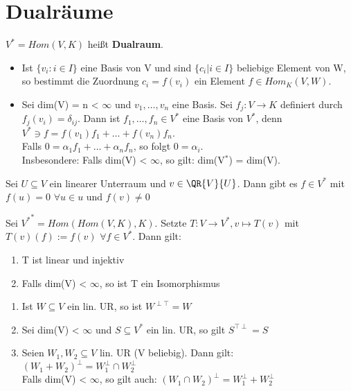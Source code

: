 \chapter{Dualräume}
\begin{definition}
$V^* = Hom(V, K)$ heißt \textbf{Dualraum}.
\end{definition}
\begin{theorem}
\leavevmode
\begin{itemize}
\item Ist $\{ v_i : i \in I \}$ eine Basis von V und sind $\{ c_i | i \in I \}$ beliebige Element von W, so bestimmt die Zuordnung $c_i = f(v_i)$ ein Element $f \in Hom_K(V,W)$.
\item Sei dim(V) = n < $\infty$ und $v_1, …, v_n$ eine Basis. Sei $f_j: V \to K$ definiert durch $f_j(v_i) = \delta_{ij}$. Dann ist $f_1, …, f_n \in V^*$ eine Basis von $V^*$, denn $V^* \ni f = f(v_1)f_1 + … + f(v_n)f_n$.\\
Falls $0 = \alpha_1 f_1 + … + \alpha_n f_n$, so folgt $0 = \alpha_i$.\\
Insbesondere: Falls dim(V) < $\infty$, so gilt: dim(V$^*$) = dim(V).
\end{itemize}
\end{theorem}

\begin{lemma}
Sei $U \subseteq V$ ein linearer Unterraum und $v \in \QR{V}{U}$. 
Dann gibt es $f \in V^*$ mit $f(u) = 0$ $\forall u \in u$ und $f(v) \neq 0$
\end{lemma}

\begin{proposition}
Sei ${V^*}^* = Hom(Hom(V,K), K)$. Setzte $T: V \to V^*, v \mapsto T(v)$ mit $T(v)(f) := f(v)$ $\forall f \in V^*$. Dann gilt:
\begin{enumerate}
\item T ist linear und injektiv
\item Falls dim(V) < $\infty$, so ist T ein Isomorphismus
\end{enumerate}
\end{proposition}

\begin{theorem}
\leavevmode
\begin{enumerate}
\item Ist $W \subseteq V$ ein lin. UR, so ist $W^{\perp \top} = W$
\item Sei dim(V) < $\infty$ und $S \subseteq V^*$ ein lin. UR, so gilt  $S^{\top \perp} = S$
\item Seien $W_1, W_2 \subseteq V$ lin. UR (V beliebig). Dann gilt:\\
$(W_1 + W_2)^\perp = W_1^\perp \cap W_2^\perp$\\
Falls dim(V) < $\infty$, so gilt auch: $(W_1 \cap W_2)^\perp = W_1^\perp + W_2^\perp$
\end{enumerate}
\end{theorem}

